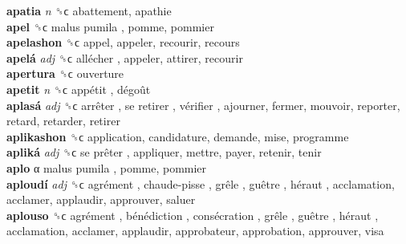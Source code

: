 \textbf{apatia} \emph{n}  ␝ϲ  abattement, apathie  \\
\textbf{apel} ␝ϲ   malus pumila , pomme, pommier  \\
\textbf{apelashon} ␝ϲ  appel, appeler, recourir, recours  \\
\textbf{apelá} \emph{adj}  ␝ϲ   allécher , appeler, attirer, recourir  \\
\textbf{apertura} ␝ϲ  ouverture  \\
\textbf{apetit} \emph{n}  ␝ϲ   appétit ,  dégoût   \\
\textbf{aplasá} \emph{adj}  ␝ϲ   arrêter ,  se retirer ,  vérifier , ajourner, fermer, mouvoir, reporter, retard, retarder, retirer  \\
\textbf{aplikashon} ␝ϲ  application, candidature, demande, mise, programme  \\
\textbf{apliká} \emph{adj}  ␝ϲ   se prêter , appliquer, mettre, payer, retenir, tenir  \\
\textbf{aplo} α   malus pumila , pomme, pommier  \\
\textbf{aploudí} \emph{adj}  ␝ϲ   agrément ,  chaude-pisse ,  grêle ,  guêtre ,  héraut , acclamation, acclamer, applaudir, approuver, saluer  \\
\textbf{aplouso} ␝ϲ   agrément ,  bénédiction ,  consécration ,  grêle ,  guêtre ,  héraut , acclamation, acclamer, applaudir, approbateur, approbation, approuver, visa  \\
